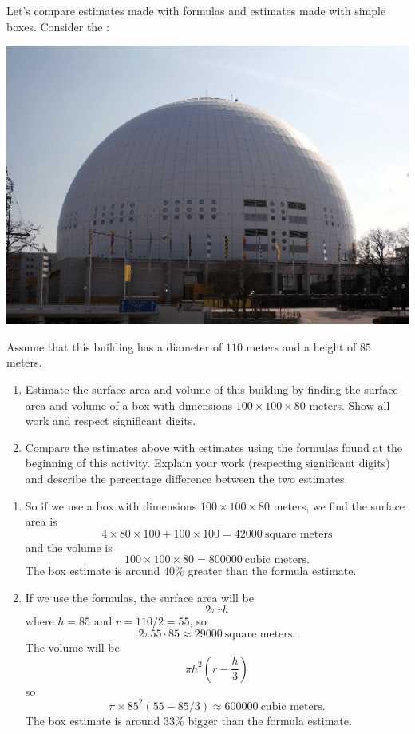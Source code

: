 \documentclass[handout,nooutcomes,noauthor,hints1,12pt]{ximera}
\begin{document}
\begin{question} \label{FG1:1}
  Let's compare estimates made with formulas and estimates made with
  simple boxes. Consider the :
   \begin{center}
    \includegraphics[width=.4\textwidth]{dome.png} %
   \end{center}
   Assume that this building has a diameter of $110$ meters and a
   height of $85$ meters.
  
\begin{enumerate}
\item Estimate the surface area and volume of this building by finding
  the surface area and volume of a box with dimensions $100\times 100
  \times 80$ meters. Show all work and respect significant digits.
\item Compare the estimates above with estimates using the formulas
  found at the beginning of this activity. Explain your work (respecting significant digits) and
  describe the percentage difference between the two estimates.
\end{enumerate}
\begin{freeResponse}
  \begin{enumerate}
  \item So if we use a box with dimensions $100\times 100 \times 80$ meters,
    we find the surface area is
    \[
    4\times 80 \times 100 +100\times 100= 42000~\text{square meters}
    \]
    and the volume is
    \[
    100\times 100 \times 80 = 800000~\text{cubic meters.}
    \]
    The box estimate is around $40\%$ greater than the formula
    estimate.
  \item If we use the formulas, the surface area will be
    \[
    2\pi rh
    \]
    where $h=85$ and $r= 110/2 = 55$, so
    \[
    2\pi 55\cdot 85 \approx  29000~\text{square meters}.
    \]
    The volume will be
    \[
    \pi h^2 \left( r- \frac{h}{3}\right)
    \]
    so
    \[
    \pi \times 85^2 (55 - 85/3) \approx 600000 ~\text{cubic meters.}
    \]
    The box estimate is around $33\%$ bigger than the formula
    estimate.
  \end{enumerate}
\end{freeResponse}
   \end{question}
\mynewpage
\end{document}
